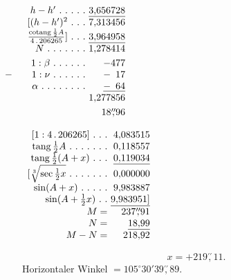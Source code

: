 \begin{minipage}[t]{.31\linewidth}\centering
$\begin{array}{r@{\ }r}
h-h'\ .\ .\ .\ .\ .&\underline{3{,}656728}\\
{[}(h-h')^2\ .\ .\ .&7{,}313456\\
\frac{\operatorname{cotang}\frac12A}{4\,.\,206265}]\ .\ .\ .&\underline{3{,}964958}\\
N\ .\ .\ .\ .\ .\ .\ .&1{,}278414\\[3pt]
1:\beta\ .\ .\ .\ .\ .\ .&-477\\
\makebox[0pt][r]{$-$\qquad}1:\nu\ .\ .\ .\ .\ .\ .&-\phantom{1}17\\
\alpha\ .\ .\ .\ .\ .\ .\ .\ .&\underline{-\phantom{1}64}\\
&1{,}277856\\[3pt]
&18\overset{\prime\prime}{,}96
\end{array}$
\end{minipage}\hfill
\begin{minipage}[t]{.34\linewidth}\centering
$\begin{array}{r@{\ }r}
{[}1:4\,.\,206265]\ .\ .\ .&4{,}083515\\
\operatorname{tang}\tfrac12A\ .\ .\ .\ .\ .\ .\ .&0{,}118557\\
\operatorname{tang}\tfrac12(A+x)\ .\ .\ .&\underline{0{,}119034}\\
{[}\sqrt[3]{\sec\tfrac12x}\ .\ .\ .\ .\ .\ .\ .&0{,}000000\\
\sin(A+x)\ .\ .\ .\ .\ .&9{,}983887\\
\sin(A+\tfrac12x)\ .\ .&\underline{9{,}983951]}\\
M=&237\overset{\prime\prime}{,}91\\
N=&\underline{18{,}99}\\
M-N=&218{,}92
\end{array}$
\end{minipage}
\[
x=+219\overset{\prime\prime}{,}11.
\]
\noindent Horizontaler Winkel $=105^\circ30'39\overset{\prime\prime}{,}89$.

